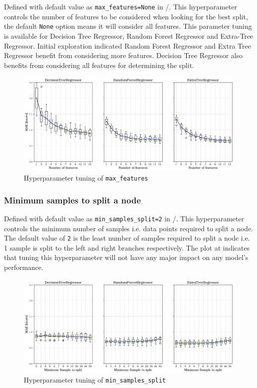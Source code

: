 Defined with default value as {\tt max\_features=None} in \scikit/. This hyperparameter controls the number of features to be considered when looking for the best split, the default {\tt None} option means it will consider all features. This parameter tuning is available for Decision Tree Regressor, Random Forest Regressor and Extra-Tree Regressor. Initial exploration indicated Random Forest Regressor and Extra Tree Regressor benefit from considering more features. Decision Tree Regressor also benefits from considering all features for determining the split.\\ 

\begin{figure}[h]
    \centering
        \includegraphics[width=.85\textwidth]{02_figures/hpo_n_features_mae.png}
        \caption{Hyperparameter tuning of {\tt max\_features}}
        \label{fig:hpo_n_features}
\end{figure}

\subsubsection*{Minimum samples to split a node}\label{sec:min_samples_split}

Defined with default value as {\tt min\_samples\_split=2} in \scikit/. This hyperparameter controls the minimum number of samples i.e. data points required to split a node. The default value of {\tt 2} is the least number of samples required to split a node i.e. 1 sample is split to the left and right branches respectively. The plot at  indicates that tuning this hyperparameter will not have any major impact on any model's performance.\\
\begin{figure}[h]
    \centering
        \includegraphics[width=.85\textwidth]{02_figures/hpo_min_samples_split_mae.png}
        \caption{Hyperparameter tuning of {\tt min\_samples\_split}}
        \label{fig:hpo_min_samples_split}
\end{figure}

